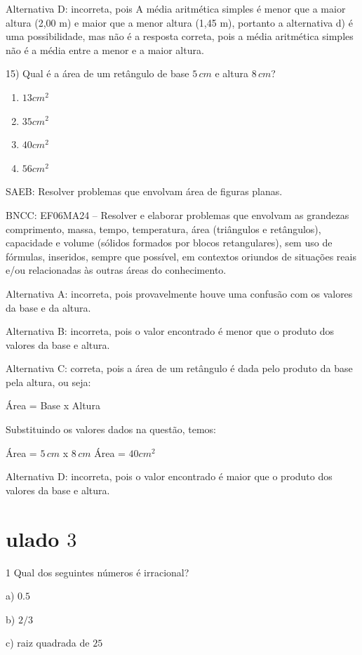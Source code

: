 Alternativa D: incorreta, pois A média aritmética simples é menor que a
maior altura (2,00 m) e maior que a menor altura (1,45 m), portanto a
alternativa d) é uma possibilidade, mas não é a resposta correta, pois a
média aritmética simples não é a média entre a menor e a maior altura.

15) Qual é a área de um retângulo de base $5\,cm$ e altura $8\,cm$?

\begin{enumerate}
\def\labelenumi{\alph{enumi})}
\item
  $13cm^2$
\item
  $35cm^2$
\item
  $40cm^2$
\item
  $56cm^2$
\end{enumerate}

SAEB: Resolver problemas que envolvam área de figuras planas.

BNCC: EF06MA24 -- Resolver e elaborar problemas que envolvam as
grandezas comprimento, massa, tempo, temperatura, área (triângulos e
retângulos), capacidade e volume (sólidos formados por blocos
retangulares), sem uso de fórmulas, inseridos, sempre que possível, em
contextos oriundos de situações reais e/ou relacionadas às outras áreas
do conhecimento.

Alternativa A: incorreta, pois provavelmente houve uma confusão com os
valores da base e da altura.

Alternativa B: incorreta, pois o valor encontrado é menor que o produto
dos valores da base e altura.

Alternativa C: correta, pois a área de um retângulo é dada pelo produto
da base pela altura, ou seja:

Área = Base x Altura

Substituindo os valores dados na questão, temos:

Área = $5\,cm$ x $8\,cm$ Área = $40cm^2$

Alternativa D: incorreta, pois o valor encontrado é maior que o produto
dos valores da base e altura.

\chapter{ulado $3$}

\num{1}  Qual dos seguintes números é irracional?

a) $0.5$

b) $2/3$

c) raiz quadrada de $25$

